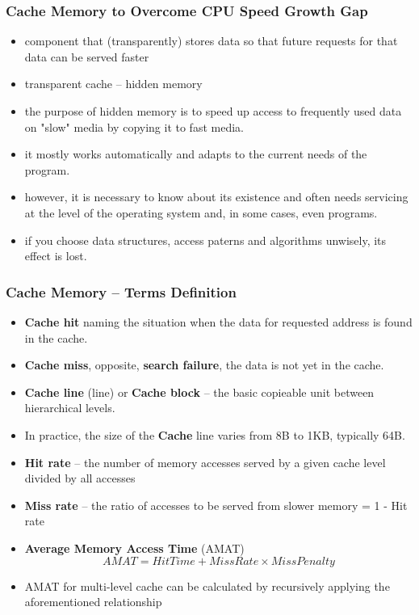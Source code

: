 \documentclass{beamer}
\begin{document}
\begin{frame}
\frametitle{Cache Memory to Overcome CPU Speed Growth Gap}

\begin{itemize}
\item component that (transparently) stores data so that future requests for that data can be served faster
\item transparent cache – hidden memory
\item the purpose of hidden memory is to speed up access to frequently used data on "slow" media by copying it to fast media.
\item it mostly works automatically and adapts to the current needs of the program.
\item however, it is necessary to know about its existence and often needs servicing at the level of the operating system and, in some cases, even programs.
\item if you choose data structures, access paterns and algorithms unwisely, its effect is lost.
\end{itemize}

\end{frame}

\begin{frame}[shrink=1]
\frametitle{Cache Memory -- Terms Definition}

\begin{itemize}
\item \textbf{Cache hit} naming the situation when the data for requested address is found in the cache.
\item \textbf{Cache miss}, opposite, \textbf{search failure}, the data is not yet in the cache.
\item \textbf{Cache line} (line) or \textbf{Cache block} – the basic copieable unit between hierarchical levels.
\item In practice, the size of the \textbf{Cache} line varies from 8B to 1KB, typically 64B.
\item \textbf{Hit rate} -- the number of memory accesses served by a given cache level divided by all accesses
\item \textbf{Miss rate} -- the ratio of accesses to be served from slower memory = 1 - Hit rate
\item \textbf{Average Memory Access Time} (AMAT) $$AMAT = Hit Time + Miss Rate \times Miss Penalty$$
\item AMAT for multi-level cache can be calculated by recursively applying the aforementioned relationship
\end{itemize}

\end{frame}
\end{document}
